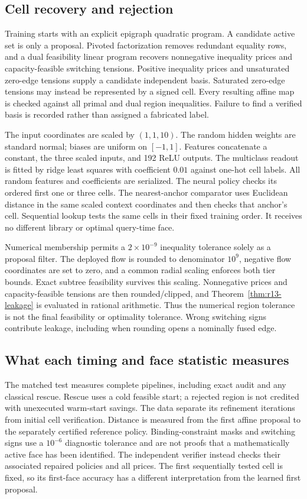 \subsection{Cell recovery and rejection}
Training starts with an explicit epigraph quadratic program. A candidate active set is only a proposal. Pivoted factorization removes redundant equality rows, and a dual feasibility linear program recovers nonnegative inequality prices and capacity-feasible switching tensions. Positive inequality prices and unsaturated zero-edge tensions supply a candidate independent basis. Saturated zero-edge tensions may instead be represented by a signed cell. Every resulting affine map is checked against all primal and dual region inequalities. Failure to find a verified basis is recorded rather than assigned a fabricated label.

The input coordinates are scaled by $(1,1,10)$. The random hidden weights are standard normal; biases are uniform on $[-1,1]$. Features concatenate a constant, the three scaled inputs, and 192 ReLU outputs. The multiclass readout is fitted by ridge least squares with coefficient $0.01$ against one-hot cell labels. All random features and coefficients are serialized. The neural policy checks its ordered first one or three cells. The nearest-anchor comparator uses Euclidean distance in the same scaled context coordinates and then checks that anchor's cell. Sequential lookup tests the same cells in their fixed training order. It receives no different library or optimal query-time face.

Numerical membership permits a $2\times10^{-9}$ inequality tolerance solely as a proposal filter. The deployed flow is rounded to denominator $10^9$, negative flow coordinates are set to zero, and a common radial scaling enforces both tier bounds. Exact subtree feasibility survives this scaling. Nonnegative prices and capacity-feasible tensions are then rounded/clipped, and Theorem~\ref{thm:r13-leakage} is evaluated in rational arithmetic. Thus the numerical region tolerance is not the final feasibility or optimality tolerance. Wrong switching signs contribute leakage, including when rounding opens a nominally fused edge.

\subsection{What each timing and face statistic measures}
The matched test measures complete pipelines, including exact audit and any classical rescue. Rescue uses a cold feasible start; a rejected region is not credited with unexecuted warm-start savings. The data separate its refinement iterations from initial cell verification. Distance is measured from the first affine proposal to the separately certified reference policy. Binding-constraint masks and switching signs use a $10^{-6}$ diagnostic tolerance and are not proofs that a mathematically active face has been identified. The independent verifier instead checks their associated repaired policies and all prices. The first sequentially tested cell is fixed, so its first-face accuracy has a different interpretation from the learned first proposal.

